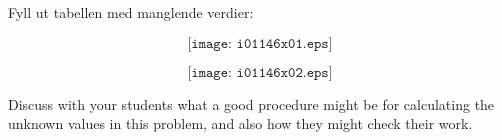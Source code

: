 

Fyll ut tabellen med manglende verdier:

$$\texttt{[image: i01146x01.eps]}$$







$$\texttt{[image: i01146x02.eps]}$$







Discuss with your students what a good procedure might be for calculating the unknown values in this problem, and also how they might check their work.




